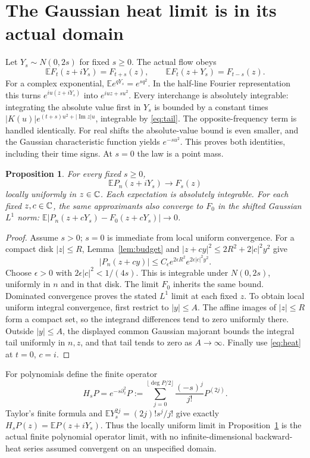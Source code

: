 \documentclass[11pt]{article}
\newtheorem{proposition}[theorem]{Proposition}
\newcommand{\E}{\mathbb E}\newcommand{\norm}[1]{\left\lVert#1\right\rVert}
\begin{document}
\section{The Gaussian heat limit is in its actual domain}
Let $Y_s\sim N(0,2s)$ for fixed $s\ge0$. The actual flow obeys
\begin{equation}\label{eq:heat}
 \E F_t(z+iY_s)=F_{t+s}(z),
 \qquad \E F_t(z+Y_s)=F_{t-s}(z).
\end{equation}
For a complex exponential, $\E e^{qY_s}=e^{sq^2}$. In the half-line
Fourier representation this turns $e^{iu(z+iY_s)}$ into
$e^{iuz+su^2}$. Every interchange is absolutely integrable: integrating
the absolute value first in $Y_s$ is bounded by a constant times
$|K(u)|e^{(t+s)u^2+|\operatorname{Im}z|u}$, integrable by
\eqref{eq:tail}. The opposite-frequency term is handled identically.
For real shifts the absolute-value bound is even smaller, and the
Gaussian characteristic function yields $e^{-su^2}$. This proves both
identities, including their time signs. At $s=0$ the law is a point mass.

\begin{proposition}\label{prop:gaussianlimit}
For every fixed $s\ge0$,
\[
 \E P_n(z+iY_s)\longrightarrow F_s(z)
\]
locally uniformly in $z\in\mathbb C$. Each expectation is absolutely integrable.
For each fixed $z,c\in\mathbb C$, the same approximants also converge to $F_0$
in the shifted Gaussian $L^1$ norm:
$\E|P_n(z+cY_s)-F_0(z+cY_s)|\to0$.
\end{proposition}
\begin{proof}
Assume $s>0$; $s=0$ is immediate from local uniform convergence.
For a compact disk $|z|\le R$, Lemma~\ref{lem:budget} and
$|z+cy|^2\le2R^2+2|c|^2y^2$ give
\[
 |P_n(z+cy)|\le C_\epsilon e^{2\epsilon R^2}
                                  e^{2\epsilon|c|^2y^2}.
\]
Choose $\epsilon>0$ with $2\epsilon|c|^2<1/(4s)$. This is integrable
under $N(0,2s)$, uniformly in $n$ and in that disk. The limit $F_0$
inherits the same bound. Dominated convergence proves the stated $L^1$
limit at each fixed $z$. To obtain local uniform integral convergence,
first restrict to $|y|\le A$. The affine images of $|z|\le R$ form a
compact set, so the integrand differences tend to zero uniformly there.
Outside $|y|\le A$, the displayed common Gaussian majorant bounds the
integral tail uniformly in $n,z$, and that tail tends to zero as
$A\to\infty$. Finally use \eqref{eq:heat} at $t=0$, $c=i$.
\end{proof}

For polynomials define the finite operator
\begin{equation}\label{eq:operator}
 H_sP=e^{-s\partial_z^2}P
       :=\sum_{j=0}^{\lfloor\deg P/2\rfloor}
                       \frac{(-s)^j}{j!}P^{(2j)}.
\end{equation}
Taylor's finite formula and
$\E Y_s^{2j}=(2j)!s^j/j!$ give exactly
$H_sP(z)=\E P(z+iY_s)$. Thus the locally uniform limit in
Proposition~\ref{prop:gaussianlimit} is the actual finite polynomial
operator limit, with no infinite-dimensional backward-heat series
assumed convergent on an unspecified domain.
\end{document}
